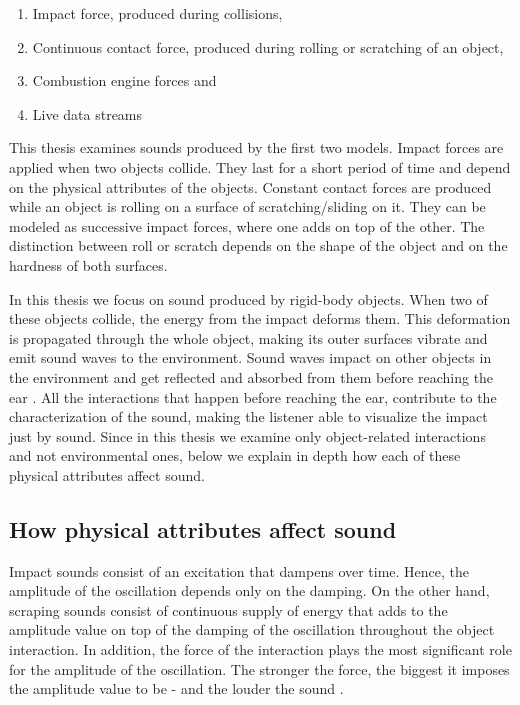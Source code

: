 \begin{enumerate}
\item Impact force, produced during collisions,
\item Continuous contact force, produced during rolling or scratching of an object,
\item Combustion engine forces and
\item Live data streams
\end{enumerate}

This thesis examines sounds produced by the first two models. Impact forces are applied when two objects collide. They last for a short period of time and depend on the physical attributes of the objects. Constant contact forces are produced while an object is rolling on a surface of scratching/sliding on it. They can be modeled as successive impact forces, where one adds on top of the other. The distinction between roll or scratch depends on the shape of the object and on the hardness of both surfaces.

In this thesis we focus on sound produced by rigid-body objects. When two of these objects collide, the energy from the impact deforms them. This deformation is propagated through the whole object, making its outer surfaces vibrate and emit sound waves to the environment. Sound waves impact on other objects in the environment and get reflected and absorbed from them before reaching the ear \cite{van1998sounds}. All the interactions that happen before reaching the ear, contribute to the characterization of the sound, making the listener able to visualize the impact just by sound. Since in this thesis we examine only object-related interactions and not environmental ones, below we explain in depth how each of these physical attributes affect sound.

\subsection{How physical attributes affect sound}

Impact sounds consist of an excitation that dampens over time. Hence, the amplitude of the oscillation depends only on the damping. On the other hand, scraping sounds consist of continuous supply of energy that adds to the amplitude value on top of the damping of the oscillation throughout the object interaction. In addition, the force of the interaction plays the most significant role for the amplitude of the oscillation. The stronger the force, the biggest it imposes the amplitude value to be - and the louder the sound \cite{gaver1993world}.

